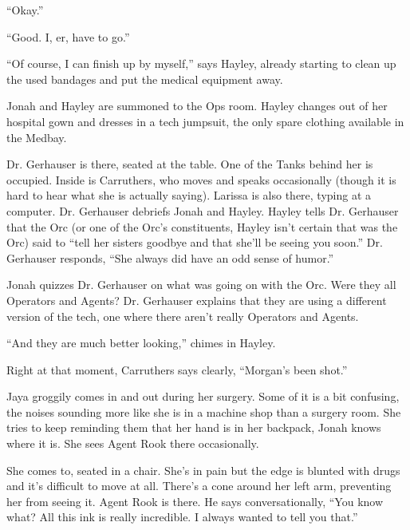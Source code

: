 ``Okay.''

``Good.  I, er, have to go.''

``Of course, I can finish up by myself,'' says Hayley, already starting to clean up the used bandages and put the medical equipment away.



Jonah and Hayley are summoned to the Ops room.  Hayley changes out of her hospital gown and dresses in a tech jumpsuit, the only spare clothing available in the Medbay.



Dr. Gerhauser is there, seated at the table.  One of the Tanks behind her is occupied.  Inside is Carruthers, who moves and speaks occasionally (though it is hard to hear what she is actually saying).  Larissa is also there, typing at a computer.  Dr. Gerhauser debriefs Jonah and Hayley.  Hayley tells Dr. Gerhauser that the Orc (or one of the Orc's constituents, Hayley isn't certain that was the Orc) said to ``tell her sisters goodbye and that she'll be seeing you soon.''  Dr. Gerhauser responds, ``She always did have an odd sense of humor.''



Jonah quizzes Dr. Gerhauser on what was going on with the Orc.  Were they all Operators and Agents?  Dr. Gerhauser explains that they are using a different version of the tech, one where there aren't really Operators and Agents.

``And they are much better looking,'' chimes in Hayley.

Right at that moment, Carruthers says clearly, ``Morgan's been shot.''





Jaya groggily comes in and out during her surgery.  Some of it is a bit confusing, the noises sounding more like she is in a machine shop than a surgery room.  She tries to keep reminding them that her hand is in her backpack, Jonah knows where it is.  She sees Agent Rook there occasionally.



She comes to, seated in a chair.  She's in pain but the edge is blunted with drugs and it's difficult to move at all.  There's a cone around her left arm, preventing her from seeing it.  Agent Rook is there.  He says conversationally, ``You know what?  All this ink is really incredible.  I always wanted to tell you that.''

